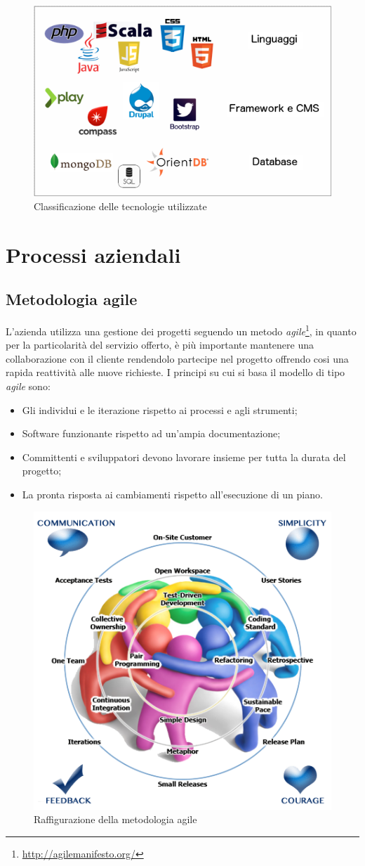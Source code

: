 \begin{figure}[h]
\centering
\includegraphics[width=0.6\linewidth]{immagini/White}
\caption[Classificazione delle tecnologie utilizzate]{Classificazione delle tecnologie utilizzate}
\label{fig:White}
\end{figure}


\section{Processi aziendali}
\subsection{Metodologia agile}
L'azienda utilizza una gestione dei progetti seguendo un metodo \textit{agile}\footnote{\url{http://agilemanifesto.org/}}, in quanto per la particolarità del servizio offerto, è più importante mantenere una collaborazione con il cliente rendendolo partecipe nel progetto offrendo cosi una rapida reattività alle nuove richieste. I principi su cui si basa il modello di tipo \textit{agile} sono:
\begin{itemize}
	\item Gli individui  e le iterazione rispetto ai processi  e agli strumenti;
	\item Software funzionante rispetto ad un'ampia documentazione;
	\item Committenti e sviluppatori devono lavorare insieme per tutta la durata del progetto;
	\item La pronta risposta ai cambiamenti rispetto all'esecuzione di un piano.
\end{itemize}

\begin{figure}[h]
\centering
\includegraphics[width=0.5\linewidth]{immagini/agile}
\caption[Raffigurazione della metodologia agile]{Raffigurazione della metodologia agile}
\label{fig:agile}
\end{figure}

